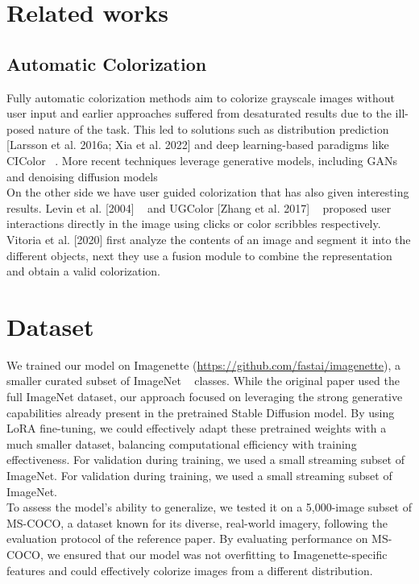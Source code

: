 \documentclass[10pt,twocolumn,letterpaper]{article}
\begin{document}
\section{Related works}

\subsection{Automatic Colorization}


Fully automatic colorization methods aim to colorize grayscale images without user input and earlier approaches suffered from desaturated results due to the ill-posed nature of the task. This led to solutions such as distribution prediction [Larsson et al. 2016a; Xia et al. 2022] and deep learning-based paradigms like CIColor ~\cite{CI}. More recent techniques leverage generative models, including GANs~\cite{GAN}~\cite{GAN1} and denoising diffusion models ~\cite{DDM}
\\
\indent
On the other side we have user guided colorization that has also given interesting results.  Levin et al. [2004] ~\cite{Levin} and UGColor [Zhang et al. 2017] ~\cite{UGColor} proposed user interactions directly in the image using clicks or color scribbles respectively. Vitoria et al. [2020] first analyze the contents of an image and segment it into the different objects, next they use a fusion module to combine the representation and obtain a valid colorization.



\section{ Dataset}

We trained our model on Imagenette (\href{https://github.com/fastai/imagenette}{https://github.com/fastai/imagenette}), a smaller curated subset of ImageNet ~\cite{ImageNet}  classes. While the original paper used the full ImageNet dataset, our approach focused on leveraging the strong generative capabilities already present in the pretrained Stable Diffusion model. By using LoRA fine-tuning, we could effectively adapt these pretrained weights with a much smaller dataset, balancing computational efficiency with training effectiveness. For validation during training, we used a small streaming subset of ImageNet. For validation during training, we used a small streaming subset of ImageNet.
\\
\indent
To assess the model’s ability to generalize, we tested it on a 5,000-image subset of MS-COCO, a dataset known for its diverse, real-world imagery, following the evaluation protocol of the reference paper. By evaluating performance on MS-COCO, we ensured that our model was not overfitting to Imagenette-specific features and could effectively colorize images from a different distribution.
\end{document}

